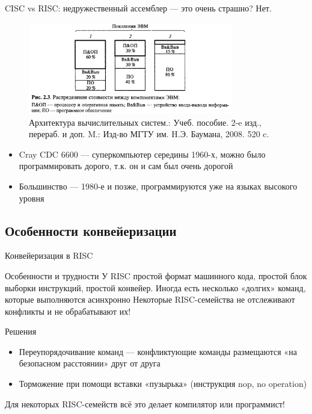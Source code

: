 \documentclass[xetex,aspectratio=43]{beamer}
\begin{document}
\begin{frame}{CISC vs RISC: недружественный ассемблер --- это очень страшно?}
    \pause
    \alert{Нет.}
    \begin{figure}
        \includegraphics[width=0.8\textwidth]{img/11.generation_prices.png}
        \caption{Архитектура вычислительных систем.: Учеб. пособие. 2-e изд., перераб. и доп. M.: Изд-во МГТУ им. H.Э. Баумана, 2008. 520 c.}
    \end{figure}

    \begin{itemize}
        \item Cray CDC 6600 --- суперкомпьютер середины 1960-х, можно было программировать дорого, т.к. он и сам был очень дорогой
        \item Большинство --- 1980-е и позже, программируются уже на языках высокого уровня
    \end{itemize}
\end{frame}

\subsection{Особенности конвейеризации}

\begin{frame}{Конвейеризация в RISC}
    \begin{block}{Особенности и трудности}
        У RISC простой формат машинного кода, простой блок выборки инструкций, простой конвейер.
        Иногда есть несколько «долгих» команд, которые выполняются асинхронно
                \alert{Некоторые RISC-семейства не отслеживают конфликты и не обрабатывают их!}
    \end{block}

    \pause

    \begin{block}{Решения}
        \begin{itemize}
            \item Переупорядочивание команд — конфликтующие команды размещаются «на безопасном расстоянии» друг от друга
            \item Торможение при помощи вставки «пузырька» (инструкция nop, no operation)
        \end{itemize}
        \alert{Для некоторых RISC-семейств всё это делает компилятор или программист!}
    \end{block}
\end{frame}
\end{document}
